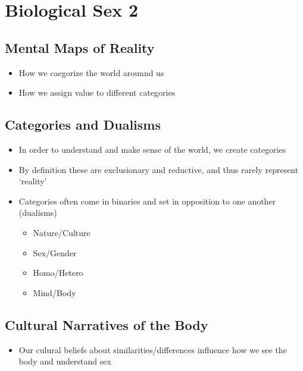 \documentclass[a4paper]{article}
\begin{document}
\setcounter{section}{6}
\section{Biological Sex 2} %
\subsection{Mental Maps of Reality}
\begin{itemize}
\item How we caegorize the world arounnd us
\item How we assign value to different categories
\end{itemize}

\subsection{Categories and Dualisms}
\begin{itemize}
\item In order to understand and make sense of the world, we create categories
\item By definition these are exclusionary and reductive, and thus rarely represent `reality'
\item Categories often come in binaries and set in opposition to one another (dualisms) \begin{itemize}
\item Nature/Culture
\item Sex/Gender
\item Homo/Hetero
\item Mind/Body
\end{itemize}
\end{itemize}

\subsection{Cultural Narratives of the Body}
\begin{itemize}
\item Our culural beliefs about similarities/differences influence how we see the body and understand sex
\end{itemize}
\end{document}
